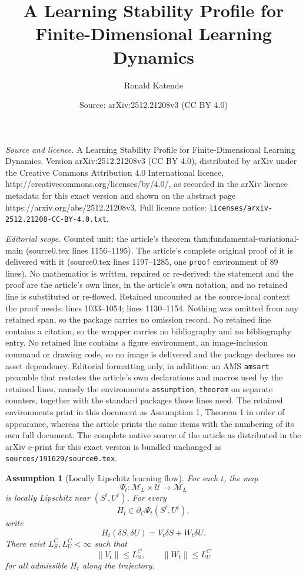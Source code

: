 \documentclass[10pt,a4paper]{amsart}
\title{A Learning Stability Profile for Finite-Dimensional Learning Dynamics}
\author{Ronald Katende}
\date{Source: arXiv:2512.21208v3 (CC BY 4.0)}
\newtheorem{assumption}{Assumption}
\begin{document}
\maketitle

\noindent\emph{Source and licence.} A Learning Stability Profile for Finite-Dimensional Learning Dynamics. Version arXiv:2512.21208v3 (CC BY 4.0), distributed by arXiv under the Creative Commons Attribution 4.0 International licence, http://creativecommons.org/licenses/by/4.0/, as recorded in the arXiv licence metadata for this exact version and shown on the abstract page https://arxiv.org/abs/2512.21208v3. Full licence notice: \texttt{licenses/arxiv-2512.21208-CC-BY-4.0.txt}.\par\smallskip

\noindent\textit{Editorial scope.} Counted unit: the article's theorem thm:fundamental-variational-main (source0.tex lines 1156--1195). The article's complete original proof of it is delivered with it (source0.tex lines 1197--1285, one \texttt{proof} environment of 89 lines). No mathematics is written, repaired or re-derived: the statement and the proof are the article's own lines, in the article's own notation, and no retained line is substituted or re-flowed.  Retained uncounted as the source-local context the proof needs: lines 1033--1054; lines 1130--1154.  Nothing was omitted from any retained span, so the package carries no omission record.  No retained line contains a citation, so the wrapper carries no bibliography and no bibliography entry.  No retained line contains a figure environment, an image-inclusion command or drawing code, so no image is delivered and the package declares no asset dependency.  Editorial formatting only, in addition: an AMS \texttt{amsart} preamble that restates the article's own declarations and macros used by the retained lines, namely the environments \texttt{assumption}, \texttt{theorem} on separate counters, together with the standard packages those lines need.  The retained environments print in this document as Assumption 1, Theorem 1 in order of appearance, whereas the article prints the same items with the numbering of its own full document.  The complete native source of the article as distributed in the arXiv e-print for this exact version is bundled unchanged as \texttt{sources/191629/source0.tex}.
\begin{assumption}[Locally Lipschitz learning flow]
\label{ass:LL}
For each \(t\), the map
\[
\Psi_t:\mathcal{M}_L\times\mathcal{U}\to\mathcal{M}_L
\]
is locally Lipschitz near \((S^t,U^t)\). For every
\[
H_t\in\partial_C\Psi_t(S^t,U^t),
\]
write
\[
H_t(\delta S,\delta U)=V_t\delta S+W_t\delta U .
\]
There exist \(L_S^C,L_U^C<\infty\) such that
\[
\|V_t\|\le L_S^C,
\qquad
\|W_t\|\le L_U^C
\]
for all admissible \(H_t\) along the trajectory.
\end{assumption}
\end{document}

